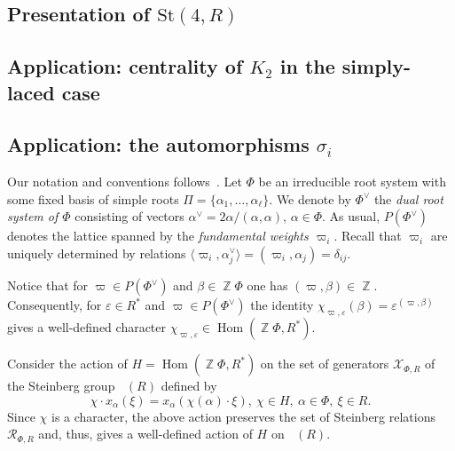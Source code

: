 \documentclass[oneside,12pt]{amsart}
\numberwithin{equation}{section}
\numberwithin{lem}{section}
\theoremstyle{definition}
\theoremstyle{remark}
\DeclareMathOperator{\St}{St^G}
\DeclareMathOperator{\Hom}{Hom}
\DeclareMathOperator{\ZZ}{{\mathbb Z}}
\newcommand{\Stb}{\mathrm{St}}
\begin{document}
\subsection{Presentation of \texorpdfstring{$\Stb(4, R)$}{St(4, R)}} \label{sec:stbA3} 

\subsection{Application: centrality of \texorpdfstring{$K_2$}{K\texttwoinferior} in the simply-laced case}


\subsection{Application: the automorphisms \texorpdfstring{$\sigma_i$}{\textsigma\textiinferior}} \label{sec:sigma}
Our notation and conventions follows~\cite[\S~4]{VavWE}.
Let $\Phi$ be an irreducible root system with some fixed basis of simple roots $\Pi = \{\alpha_1, \ldots, \alpha_\ell\}$.
We denote by $\Phi^\vee$ the \emph{dual root system of $\Phi$} consisting of vectors $\alpha^\vee = 2\alpha/(\alpha, \alpha)$, $\alpha\in \Phi$.
As usual, $P(\Phi^\vee)$ denotes the lattice spanned by the \emph{fundamental weights $\varpi_i$}.
Recall that $\varpi_i$ are uniquely determined by relations $\langle\varpi_i, \alpha_j^\vee \rangle = (\varpi_i, \alpha_j) = \delta_{ij}.$

Notice that for $\varpi \in P(\Phi^\vee)$ and $\beta \in \ZZ \Phi$ one has $(\varpi, \beta) \in \ZZ$.
Consequently, for $\varepsilon \in R^*$ and $\varpi \in P(\Phi^\vee)$ the identity $\chi_{\varpi, \varepsilon}(\beta) = \varepsilon ^ {(\varpi, \beta)}$
gives a well-defined character $\chi_{\varpi, \varepsilon} \in \Hom(\ZZ \Phi, R^*)$.

Consider the action of $H=\Hom(\ZZ \Phi, R^*)$ on the set of generators $\mathcal{X}_{\Phi, R}$ of the Steinberg group $\St(R)$ defined by
\begin{equation} \chi \cdot x_\alpha(\xi) = x_\alpha(\chi(\alpha) \cdot \xi),\ \chi \in H,\ \alpha\in \Phi,\ \xi \in R. \end{equation}
Since $\chi$ is a character, the above action preserves the set of Steinberg relations $\mathcal{R}_{\Phi, R}$ and,
thus, gives a well-defined action of $H$ on $\St(R)$.
\end{document}

